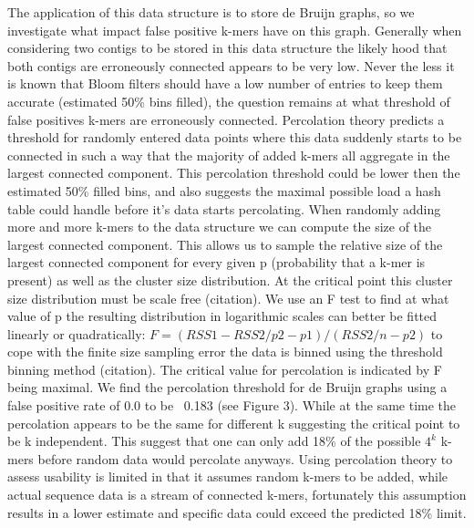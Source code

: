 \documentclass[12pt]{article} \usepackage{simplemargins}
\begin{document}
The application of this data structure is to store de Bruijn graphs,
so we investigate what impact false positive k-mers have on this
graph. Generally when considering two contigs to be stored in this
data structure the likely hood that both contigs are erroneously
connected appears to be very low. Never the less it is known that
Bloom filters should have a low number of entries to keep them
accurate (estimated 50\% bins filled), the question remains at what
threshold of false positives k-mers are erroneously
connected. Percolation theory predicts a threshold for randomly entered data
points where this data suddenly starts to be connected in such a way that the majority 
of added k-mers all aggregate in the largest connected component. This percolation
threshold could be lower then the estimated 50\% filled bins, and also
suggests the maximal possible load a hash table could handle before it's data
starts percolating. 
When randomly adding more and more k-mers to the data
structure we can compute the size of the largest connected
component. This allows us to sample the relative size of the largest connected component
for every given p (probability that a k-mer is present) as well as the cluster size distribution.
At the critical point this cluster size distribution must be scale free (citation). We use an F test
to find at what value of p the resulting distribution in logarithmic scales can
better be fitted linearly or quadratically:
$F=(RSS1-RSS2/p2-p1)/(RSS2/n-p2)$
to cope with the finite size sampling error the data is binned using the
threshold binning method (citation).
The critical value for percolation is indicated by F being maximal.
We find the percolation threshold for de Bruijn graphs using a false 
positive rate of 0.0 to be ~0.183 (see Figure 3). While at the same time
the percolation appears to be the same for different k suggesting the 
critical point to be k independent.
This suggest that one can only add 18\% of the possible $4^k$ k-mers
before random data would percolate anyways. Using percolation theory to 
assess usability is limited in that it assumes
random k-mers to be added, while actual sequence data is a stream of
connected k-mers, fortunately this assumption results in a lower estimate and specific data
could exceed the predicted 18\% limit.
\end{document}
